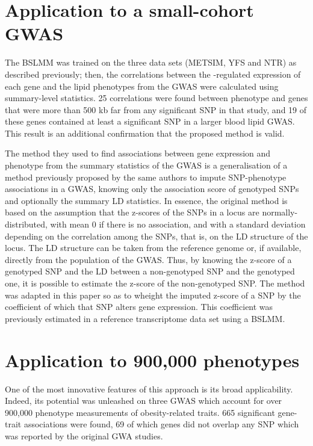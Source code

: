 \documentclass[../main.tex]{subfiles}
\begin{document}
\section{Application to a small-cohort GWAS}

The BSLMM was trained on the three data sets (METSIM, YFS and NTR) as 
described previously; then, the correlations between the \cis-regulated 
expression of each gene and the lipid phenotypes from the GWAS were 
calculated using summary-level statistics. 25 correlations were found 
between phenotype and genes that were more than 500 kb far from any 
significant SNP in that study, and 19 of these genes contained at least 
a significant SNP in a larger blood lipid GWAS. This result is an 
additional confirmation that the proposed method is valid.

The method they used to find associations between gene expression and 
phenotype from the summary statistics of the GWAS is a generalisation of 
a method previously proposed by the same authors to impute SNP-phenotype 
associations in a GWAS, knowing only the association score of genotyped 
SNPs\cite{Pasaniuc2014} and optionally the summary LD statistics. In 
essence, the original method is based on the assumption that the 
z-scores of the SNPs in a locus are normally-distributed, with mean 0 
if there is no association, and with a standard deviation depending on 
the correlation among the SNPs, that is, on the LD structure of the 
locus. The LD structure can be taken from the reference genome or, if 
available, directly from the population of the GWAS. Thus, by knowing 
the z-score of a genotyped SNP and the LD between a non-genotyped SNP 
and the genotyped one, it is possible to estimate the z-score of the 
non-genotyped SNP. The method was adapted in this paper so as to wheight 
the imputed z-score of a SNP by the coefficient of which that SNP alters 
gene expression. This coefficient was previously estimated in a 
reference transcriptome data set using a BSLMM.

\section{Application to 900,000 phenotypes}

One of the most innovative features of this approach is its broad 
applicability. Indeed, its potential was unleashed on three GWAS which 
account for over 900,000 phenotype measurements of obesity-related 
traits. 665 
significant gene-trait associations were found, 69 of which genes did 
not overlap any SNP which was reported by the original GWA studies.
\end{document}
